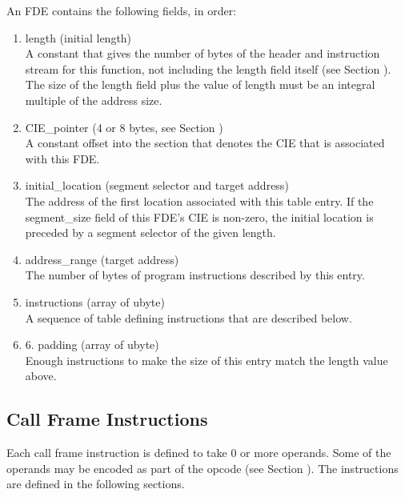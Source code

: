 An FDE contains the following fields, in order:

\begin{enumerate}[1.]
\item length (initial length)  \\

A constant that gives the number of bytes of the header and
instruction stream for this function, not including the length
field itself 
(see Section  ). 
The size of the length field
plus the value of length must be an integral multiple of the
address size.

\item   CIE\_pointer (4 or 8 bytes, see Section ) \\
A constant offset into the 
section that denotes
the CIE that is associated with this FDE.

\item  initial\_location (segment selector and target address) \\
The address of the first location associated with this table
entry. If the segment\_size field of this FDE's CIE is non-zero,
the initial location is preceded by a segment selector of
the given length.

\item  address\_range (target address) \\
The number of bytes of program instructions described by this entry.

\item instructions (array of ubyte) \\
A sequence of table defining instructions that are described below.

\item 6. padding (array of ubyte) \\
Enough  instructions to make the size of this
entry match the length value above.
\end{enumerate}

\subsection{Call Frame Instructions}
\label{chap:callframeinstructions}

Each call frame instruction is defined to take 0 or more
operands. Some of the operands may be encoded as part of the
opcode 
(see Section ). 
The instructions are defined in
the following sections.

